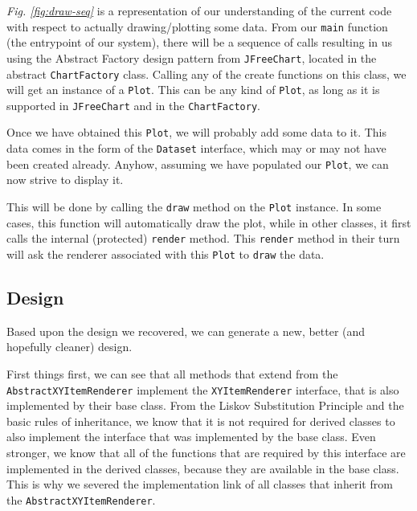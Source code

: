 \documentclass[11pt]{article}
\begin{document}
	\textsl{Fig. \ref{fig:draw-seq}} is a representation of our understanding of the current code with respect to actually drawing/plotting some data. From our \texttt{main} function (the entrypoint of our system), there will be a sequence of calls resulting in us using the \textsf{Abstract Factory} design pattern from \texttt{JFreeChart}, located in the abstract \texttt{ChartFactory} class. Calling any of the create functions on this class, we will get an instance of a \texttt{Plot}. This can be any kind of \texttt{Plot}, as long as it is supported in \texttt{JFreeChart} and in the \texttt{ChartFactory}.
	
	Once we have obtained this \texttt{Plot}, we will probably add some data to it. This data comes in the form of the \texttt{Dataset} interface, which may or may not have been created already. Anyhow, assuming we have populated our \texttt{Plot}, we can now strive to display it.
	
	This will be done by calling the \texttt{draw} method on the \texttt{Plot} instance. In some cases, this function will automatically draw the plot, while in other classes, it first calls the internal (protected) \texttt{render} method. This \texttt{render} method in their turn will ask the renderer associated with this \texttt{Plot} to \texttt{draw} the data.

	\subsection{Design}
	\label{sec:design}
	Based upon the design we recovered, we can generate a new, better (and hopefully cleaner) design.
	
	First things first, we can see that all methods that extend from the \texttt{AbstractXYItemRenderer} implement the \texttt{XYItemRenderer} interface, that is also implemented by their base class. From the \textsf{Liskov Substitution Principle} \cite{Liskov94abehavioral} and the basic rules of inheritance, we know that it is not required for derived classes to also implement the interface that was implemented by the base class. Even stronger, we know that all of the functions that are required by this interface are implemented in the derived classes, because they are available in the base class. This is why we severed the implementation link of all classes that inherit from the \texttt{AbstractXYItemRenderer}.
	
\end{document}
